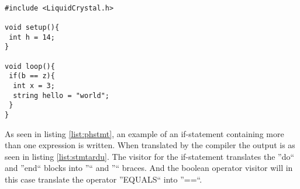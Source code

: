\begin{lstlisting}[caption=Example of an if-statement in the Arduino language translated by the compiler from BAL, label=list:stmtardu]

#include <LiquidCrystal.h>

void setup(){
 int h = 14;
}

void loop(){
 if(b == z){
  int x = 3;
  string hello = "world";
 }
}
\end{lstlisting}

As seen in listing \ref{list:phstmt}, an example of an if-statement containing more than one expression is written. When translated by the compiler the output is as seen in listing \ref{list:stmtardu}. The visitor for the if-statement translates the ''do`` and ''end`` blocks into ''{`` and ''}`` braces. And the boolean operator visitor will in this case translate the operator ''EQUALS`` into ''==``.